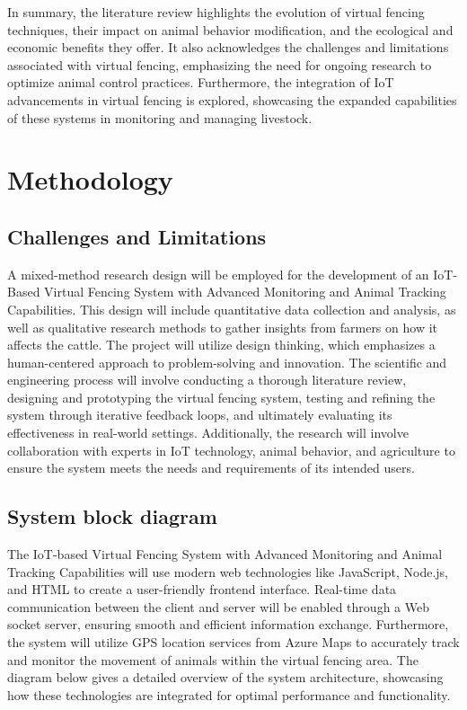 \documentclass[conference]{main}
\begin{document}
In summary, the literature review highlights the evolution of virtual fencing
techniques, their impact on animal behavior modification, and the ecological and
economic benefits they offer. It also acknowledges the challenges and
limitations associated with virtual fencing, emphasizing the need for ongoing
research to optimize animal control practices. Furthermore, the integration of
IoT advancements in virtual fencing is explored, showcasing the expanded
capabilities of these systems in monitoring and managing livestock.


\section{Methodology}

\subsection{Challenges and Limitations}

A mixed-method research design will be employed for the development of an
IoT-Based Virtual Fencing System with Advanced Monitoring and Animal Tracking
Capabilities. This design will include quantitative data collection and
analysis, as well as qualitative research methods to gather insights from
farmers on how it affects the cattle. The project will utilize design thinking,
which emphasizes a human-centered approach to problem-solving and innovation.
The scientific and engineering process will involve conducting a thorough
literature review, designing and prototyping the virtual fencing system, testing
and refining the system through iterative feedback loops, and ultimately
evaluating its effectiveness in real-world settings. Additionally, the research
will involve collaboration with experts in IoT technology, animal behavior, and
agriculture to ensure the system meets the needs and requirements of its
intended users.

\subsection{System block diagram}

The IoT-based Virtual Fencing System with Advanced Monitoring and Animal
Tracking Capabilities will use modern web technologies like JavaScript, Node.js,
and HTML to create a user-friendly frontend interface. Real-time data
communication between the client and server will be enabled through a Web socket
server, ensuring smooth and efficient information exchange. Furthermore, the
system will utilize GPS location services from Azure Maps to accurately track
and monitor the movement of animals within the virtual fencing area. The diagram
below gives a detailed overview of the system architecture, showcasing how these
technologies are integrated for optimal performance and functionality.
\end{document}
